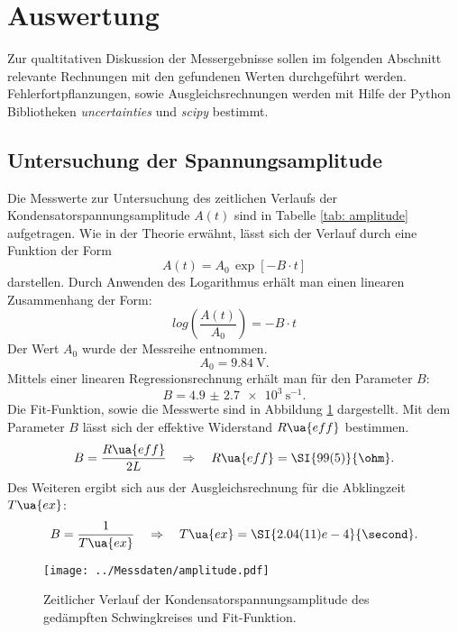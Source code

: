 \section{Auswertung}
Zur qualtitativen Diskussion der Messergebnisse sollen im folgenden Abschnitt relevante Rechnungen mit den gefundenen
Werten durchgeführt werden. Fehlerfortpflanzungen, sowie Ausgleichsrechnungen werden mit
Hilfe der Python Bibliotheken \emph{uncertainties}\cite{uncertainties} und \emph{scipy}\cite{scipy} bestimmt.
\subsection{Untersuchung der Spannungsamplitude}
Die Messwerte zur Untersuchung des zeitlichen Verlaufs der Kondensatorspannungsamplitude $A(t)$ sind in Tabelle \ref{tab: amplitude} aufgetragen. Wie in der Theorie erwähnt,
lässt sich der Verlauf durch eine Funktion der Form
\begin{equation}
  A(t) = A_0 \, \exp[-B\cdot t]
\end{equation}
darstellen. Durch Anwenden des Logarithmus erhält man einen linearen Zusammenhang der Form:
\begin{equation}
  log \left( \frac{A(t)}{A_0} \right) = - B\cdot t
\end{equation}
Der Wert $A_0$ wurde der Messreihe entnommen.
\begin{equation}
  A_0 = \SI{9.84}{\volt}.
\end{equation}
Mittels einer linearen Regressionsrechnung erhält man für den Parameter $B$:
\begin{equation}
  B = \SI{4.9(27)e3}{\second^{-1}}.
\end{equation}
Die Fit-Funktion, sowie die Messwerte sind in Abbildung \ref{fig: amplitude} dargestellt.
Mit dem Parameter $B$ lässt sich der effektive Widerstand $R\ua{eff}$ bestimmen.
\begin{equation}
  B = \frac{R\ua{eff}}{2 L} \quad \Rightarrow \quad R\ua{eff} =  \SI{99(5)}{\ohm}.
  \label{eq: Fitparameter}
\end{equation}
Des Weiteren ergibt sich aus der Ausgleichsrechnung für die Abklingzeit $T\ua{ex}$:
\begin{equation}
  B = \frac{1}{T\ua{ex}} \quad \Rightarrow \quad T\ua{ex} =  \SI{2.04(11)e-4}{\second}.
\end{equation}

\begin{figure}
  \centering
  \texttt{[image: ../Messdaten/amplitude.pdf]}
  \caption{Zeitlicher Verlauf der Kondensatorspannungsamplitude des gedämpften Schwingkreises und Fit-Funktion.}
  \label{fig: amplitude}
\end{figure}

